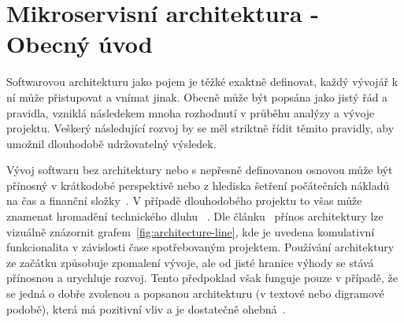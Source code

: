 \chapter{Mikroservisní architektura - Obecný úvod}\label{ch:msa-intro}



Softwarovou architekturu jako pojem je těžké exaktně definovat, každý vývojář k ní může přistupovat a vnímat jinak.
Obecně může být popsána jako jistý řád a pravidla, vzniklá následekem mnoha rozhodnutí v průběhu analýzy a vývoje projektu.
Veškerý následující rozvoj by se měl striktně řídit těmito pravidly, aby umožnil dlouhodobě udržovatelný výsledek.
~\cite{softarch}

Vývoj softwaru bez architektury nebo s nepřesně definovanou osnovou může být přínosný v krátkodobé perspektivě nebo z hlediska šetření počátečních nákladů na čas a finanční složky~\cite{softarch}.
V případě dlouhodobého projektu to všas může znamenat hromadění technického dluhu ~\cite{archoworthit}.
Dle článku~\cite{archoworthit} přínos architektury lze vizuálně znázornit grafem~\ref{fig:architecture-line}, kde je uvedena komulativní funkcionalita v závislosti čase spotřebovaným projektem.
Používání architektury ze začátku způsobuje zpomalení vývoje, ale od jisté hranice výhody se stává přínosnou a urychluje rozvoj.
Tento předpoklad však funguje pouze v případě, že se jedná o dobře zvolenou a popsanou architekturu (v textové nebo digramové podobě), která má pozitivní vliv a je dostatečně ohebná~\cite{archoworthit}.


